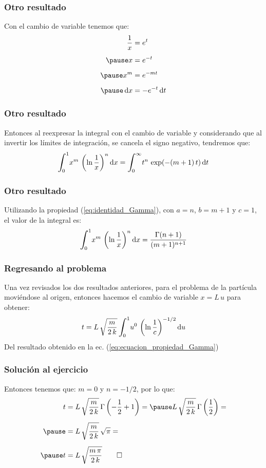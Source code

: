 \documentclass[12pt]{beamer}
\begin{document}
\begin{frame}
\frametitle{Otro resultado}
Con el cambio de variable tenemos que:
\begin{eqnarray*}
\begin{aligned}
\dfrac{1}{x} &= e^{t} \\[0.5em] \pause
x &= e^{-t} \\[0.5em] \pause
x^{m} &= e^{-m t} \\[0.5em] \pause
\dd{x} &= - e^{-t} \dd{t}
\end{aligned}
\end{eqnarray*}
\end{frame}
\begin{frame}
\frametitle{Otro resultado}
Entonces al reexpresar la integral con el cambio de variable y considerando que al invertir los límites de integración, se cancela el signo negativo, tendremos que:
\pause
\begin{align*}
\scaleint{6ex}_{\bs 0}^{1} x^{m} \, \left( \ln \dfrac{1}{x} \right)^{n} \dd{x} = \scaleint{6ex}_{\bs 0}^{\infty} t^{n} \, \exp(-(m+1) \, t) \dd{t}
\end{align*}
\end{frame}
\begin{frame}
\frametitle{Otro resultado}
Utilizando la propiedad (\ref{eq:identidad_Gamma}), con $a = n$, $b = m + 1$ y $c = 1$, el valor de la integral es:
\pause 
\begin{align}
\scaleint{6ex}_{\bs 0}^{1} x^{m} \, \left( \ln \dfrac{1}{x} \right)^{n} \dd{x} = \dfrac{\Gamma (n + 1)}{(m + 1)^{n+1}}
\label{eq:ecuacion_propiedad_Gamma}
\end{align}
\end{frame}
\begin{frame}
\frametitle{Regresando al problema}
Una vez revisados los dos resultados anteriores, para el problema de la partícula moviéndose al origen, entonces hacemos el cambio de variable $x = L \, u$ para obtener:
\pause 
\begin{align*}
t = L \, \sqrt{\dfrac{m}{2 \, k}} \, \scaleint{6ex}_{\bs 0}^{1} u^{0} \, \left( \ln \dfrac{1}{c} \right)^{-1/2} \dd{u}
\end{align*}
\pause
Del resultado obtenido en la ec. (\ref{eq:ecuacion_propiedad_Gamma})
\end{frame}
\begin{frame}
\frametitle{Solución al ejercicio}
Entonces tenemos que: $m = 0$ y $n = -1/2$, por lo que:
\pause
\begin{eqnarray*}
\begin{aligned}
t &= L \, \sqrt{\dfrac{m}{2 \, k}} \, \Gamma \left( - \dfrac{1}{2} + 1 \right) = \pause L \, \sqrt{\dfrac{m}{2 \, k}} \, \Gamma \left( \dfrac{1}{2} \right) = \\[0.5em] \pause
&= L \, \sqrt{\dfrac{m}{2 \, k}} \, \sqrt{\pi} = \\[0.5em] \pause
t &= L \, \sqrt{\dfrac{m \, \pi}{2 \, k}} \qed
\end{aligned}
\end{eqnarray*}
\end{frame}
\end{document}
